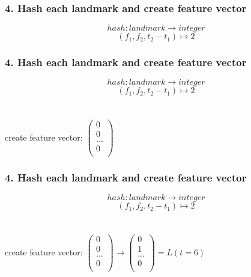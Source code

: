 \documentclass{beamer}
\begin{document}
\begin{frame}
\frametitle{4. Hash each landmark and create feature vector}
\begin{displaymath}
hash: landmark \rightarrow integer 
\end{displaymath}
\begin{displaymath}
(f_1, f_2, t_2-t_1) \mapsto 2
\end{displaymath}
\end{frame}



\begin{frame}
\frametitle{4. Hash each landmark and create feature vector}
\begin{displaymath}
hash: landmark \rightarrow integer 
\end{displaymath}
\begin{displaymath}
(f_1, f_2, t_2-t_1) \mapsto 2
\end{displaymath}
\ \\
\ \\
create feature vector: $\left( \begin{array}{c}
0\\
0\\
...\\
0\\
\end{array}
\right)$
\end{frame}


\begin{frame}
\frametitle{4. Hash each landmark and create feature vector}
\begin{displaymath}
hash: landmark \rightarrow integer 
\end{displaymath}
\begin{displaymath}
(f_1, f_2, t_2-t_1) \mapsto 2
\end{displaymath}
\ \\
\ \\
create feature vector: $\left( \begin{array}{c}
0\\
0\\
...\\
0\\
\end{array}
\right)
\rightarrow
\left( \begin{array}{c}
0\\
1\\
...\\
0\\
\end{array}
\right)
=
L(t=6)
$
\end{frame}
\end{document}
